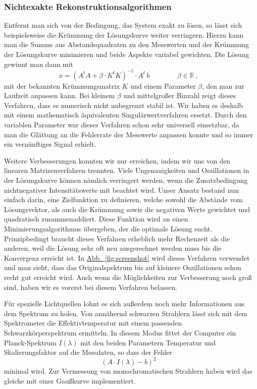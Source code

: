 \documentclass[11pt]{scrartcl}
\newcommand{\hypref}[2]{\hyperref[#2]{{#1}~\ref{#2}}}
\begin{document}
\subsubsection{Nichtexakte Rekonstruktionsalgorithmen}
Entfernt man sich von der Bedingung, das System exakt zu lösen, so lässt sich beispielsweise die Krümmung der Lösungskurve weiter verringern.
Hierzu kann man die Summe aus Abstandsquadraten zu den Messwerten und der Krümmung der Lösungskurve minimieren und beide Aspekte variabel gewichten.
Die Lösung gewinnt man dann mit
\begin{equation}
x = (A^tA+\beta\cdot K^tK)^{-1}\cdot A^t\,b
\qquad\qquad
\beta\in\mathbb{R} \ ,
\end{equation}
mit der bekannten Krümmungsmatrix $K$ und einem Parameter $\beta$, den man zur Laufzeit anpassen kann.
Bei kleinem $\beta$ und mittelgroßer Binzahl zeigt dieses Verfahren, dass es numerisch nicht unbegrenzt stabil ist.
Wir haben es deshalb mit einem mathematisch äquivalenten Singulärwertverfahren ersetzt.
Durch den variablen Parameter war dieses Verfahren schon sehr universell einsetzbar, da man die Glättung an die Fehlerrate der Messwerte anpassen konnte und so immer ein vernünftiges Signal erhielt.

Weitere Verbesserungen konnten wir nur erreichen, indem wir uns von den linearen Matrizenverfahren trennten.
Viele Ungenauigkeiten und Oszillationen in der Lösungskurve können nämlich verringert werden, wenn die Zusatzbedingung nichtnegativer Intensitätswerte mit beachtet wird.
Unser Ansatz bestand nun einfach darin, eine Zielfunktion zu definieren, welche sowohl die Abstände vom Lösungsvektor, als auch die Krümmung sowie die negativen Werte gewichtet und quadratisch zusammenaddiert.
Diese Funktion wird an einen Minimierungsalgorithmus übergeben, der die optimale Lösung sucht.
Prinzipbedingt braucht dieses Verfahren erheblich mehr Rechenzeit als die anderen, weil die Lösung sehr oft neu ausgerechnet werden muss bis die Konvergenz erreicht ist.
In \hypref{Abb.}{fig:screenshot} wird dieses Verfahren verwendet und man sieht, dass das Originalspektrum bis auf kleinere Oszillationen schon recht gut erreicht wird.
Auch wenn die Möglichkeiten zur Verbesserung noch groß sind, haben wir es vorerst bei diesem Verfahren belassen.

Für spezielle Lichtquellen lohnt es sich außerdem noch mehr Informatio\-nen aus dem Spektrum zu holen.
Von annähernd schwarzen Strahlern lässt sich mit dem Spektrometer die Effektivtemperatur mit einem passenden Schwarz\-körperspektrum ermitteln.
In diesem Modus fittet der Computer ein Planck-Spektrum $I(\lambda)$ mit den beiden Parametern Temperatur und Skalierungsfaktor auf die Messdaten, so dass der Fehler
\begin{equation}
\left(
A\cdot I(\lambda) - b
\right)^2
\end{equation}
minimal wird.
Zur Vermessung von monochromatischen Strahlern haben wird das gleiche mit einer Gaußkurve implementiert.
\end{document}
